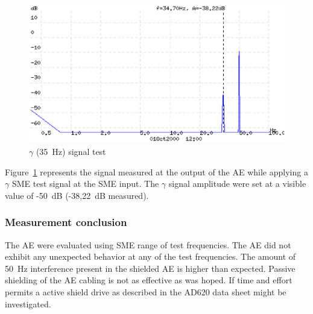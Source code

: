\begin{figure}[htbp]
\begin{center}
	\includegraphics[width=\textwidth]{AE535SME.ps}
	\caption{$\gamma$ (35~Hz) signal test}
	\label{fig:ae-sme35}
\end{center}
\end{figure}

Figure~\ref{fig:ae-sme35} represents the signal measured at the output
of the AE while applying a $\gamma$ SME test signal at the SME
input. The $\gamma$ signal amplitude were set at a visible value of
-50~dB (-38,22~dB measured).

\subsubsection{Measurement conclusion}

The AE were evaluated using SME range of test frequencies. The AE did
not exhibit any unexpected behavior at any of the test
frequencies. The amount of 50~Hz interference present in the shielded
AE is higher than expected. Passive shielding of the AE cabling is not
as effective as was hoped. If time and effort permits a active shield
drive as described in the AD620 data sheet might be investigated.




